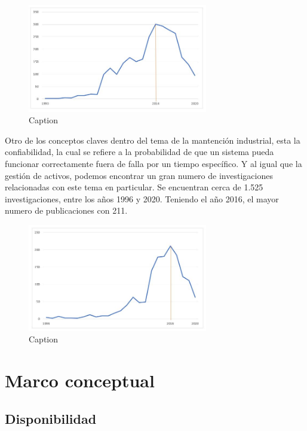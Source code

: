 \documentclass[]{article}
\begin{document}
\newpage
\begin{figure}[!h]
    \centering
    \includegraphics[width=0.7\textwidth]{1.JPG}
    \caption{Caption}
    \label{fig:my_label}
\end{figure}

Otro de los conceptos claves dentro del tema de la mantención industrial, esta la confiabilidad, la cual se refiere a la probabilidad de que un sistema pueda funcionar correctamente fuera de falla por un tiempo específico. Y al igual que la gestión de activos, podemos encontrar un gran numero de investigaciones relacionadas con este tema en particular. Se encuentran cerca de 1.525 investigaciones, entre los años 1996 y 2020. Teniendo el año 2016, el mayor numero de publicaciones con 211.

\begin{figure}[!h]
    \centering
    \includegraphics[width=0.7\textwidth]{2.JPG}
    \caption{Caption}
    \label{fig:my_label}
\end{figure}

\hypertarget{marco-conceptual-descripcion-detallada}{%
\section{Marco conceptual}
\label{marco-conceptual-descripcion-detallada}}

\subsection{Disponibilidad}
\end{document}
